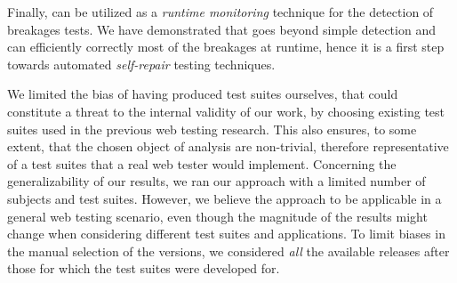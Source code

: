 Finally, \tool can be utilized as a \textit{runtime monitoring}  technique for the detection of breakages tests. We have demonstrated that \tool goes beyond simple detection and can efficiently correctly most of the breakages at runtime, hence it is a first step towards automated \textit{self-repair} testing techniques. 

\label{sec:ttv}
We limited the bias of having produced test suites ourselves, that could constitute a threat to the internal validity of our work, by choosing existing test suites used in the previous web testing research. This also ensures, to some extent, that the chosen object of analysis are non-trivial, therefore representative of a test suites that a real web tester would implement. 
%
Concerning the generalizability of our results, we ran our approach with a limited number of subjects and test suites. However, we believe the approach to be applicable in a general web testing scenario, even though the magnitude of the results might change when considering different test suites and applications. To limit biases in the manual selection of the versions, we considered \textit{all} the available releases after those for which the test suites were developed for.